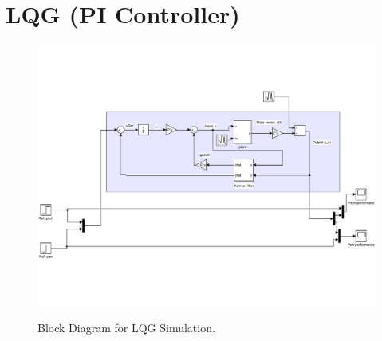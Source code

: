 \section{LQG (PI Controller)}
\begin{figure}[!htbp]
    \centering
    \includegraphics[width=.8\textwidth,keepaspectratio=true]{figs/img/LQG_Simulink}
    \label{fig:LQG_Sim_Block_Diagram}
    \caption{Block Diagram for LQG Simulation.}
\end{figure}
